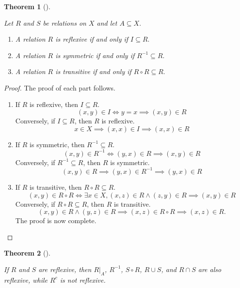 \documentclass[
  letterpaper,
  10pt,
  reqno,
  twopage,
  openany]{book}
\providecommand{\tightlist}{%
  \setlength{\itemsep}{0pt}\setlength{\parskip}{0pt}}\usepackage{longtable,booktabs,array}
\theoremstyle{plain}
\theoremstyle{definition}
\theoremstyle{definition}
\theoremstyle{definition}
\theoremstyle{plain}
\theoremstyle{plain}
\newtheorem{theorem}{Theorem}[chapter]
\theoremstyle{remark}
\begin{document}
\leavevmode{}%
\begin{theorem}[]\label{thm-reflexive-symmetric-transitive}

Let \(R\) and \(S\) be relations on \(X\) and let \(A\subseteq X.\)

\begin{enumerate}
\def\labelenumi{\arabic{enumi}.}
\tightlist
\item
  A relation \(R\) is reflexive if and only if \(I \subseteq R.\)
\item
  A relation \(R\) is symmetric if and only if \(R^{-1}\subseteq R.\)\\
\item
  A relation \(R\) is transitive if and only if \(R\circ R\subseteq R.\)
\end{enumerate}

\end{theorem}

\begin{proof}

The proof of each part follows.

\begin{enumerate}
\def\labelenumi{\arabic{enumi}.}
\item
  If \(R\) is reflexive, then \(I\subseteq R.\) \[
  (x,y)\in I \Leftrightarrow y=x \implies (x,y)\in R
  \] Conversely, if \(I\subseteq R\), then \(R\) is reflexive. \[
  x\in X \implies (x,x)\in I \implies (x,x)\in R
  \]
\item
  If \(R\) is symmetric, then \(R^{-1}\subseteq R.\) \[
  (x,y)\in R^{-1}\Leftrightarrow (y,x)\in R \implies (x,y)\in R
  \] Conversely, if \(R^{-1}\subseteq R\), then \(R\) is symmetric. \[
  (x,y)\in R \implies (y,x)\in R^{-1} \implies (y,x)\in R
  \]
\item
  If \(R\) is transitive, then \(R\circ R\subseteq R.\) \[
  (x,y)\in R\circ R \Leftrightarrow \exists x\in X, (x,z)\in R \land (z,y)\in R \implies (x,y)\in R
  \] Conversely, if \(R\circ R\subseteq R\), then \(R\) is transitive.
  \[
  (x,y)\in R \land (y,z)\in R \implies (x,z)\in R\circ R \implies (x,z)\in R.
  \] The proof is now complete.
\end{enumerate}

\end{proof}

\leavevmode{}%
\begin{theorem}[]\label{thm-reflexive}

If \(R\) and \(S\) are reflexive, then \(R|_A\), \(R^{-1}\),
\(S\circ R\), \(R\cup S\), and \(R\cap S\) are also reflexive, while
\(R^c\) is not reflexive.

\end{theorem}
\end{document}
